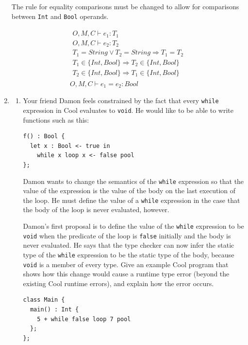 \documentclass[11pt]{article}
\begin{document}
\begin{enumerate}
The rule for equality comparisons must be changed to allow for
comparisons between \texttt{Int} and \texttt{Bool} operands.

\begin{equation}
\begin{array}{c}
\begin{array}{l}
O, M, C \vdash e_{1} : T_{1} \\
O, M, C \vdash e_{2} : T_{2} \\
T_{1} = String \lor T_{2} = String \Rightarrow T_{1} = T_{2} \\
T_{1} \in \{Int, Bool\} \Rightarrow T_{2} \in \{Int, Bool\} \\
T_{2} \in \{Int, Bool\} \Rightarrow T_{1} \in \{Int, Bool\}
\end{array} \\
\hline
O, M, C \vdash e_{1} = e_{2} : Bool
\end{array}
\tag*{[Equal]}
\end{equation}

\item
\begin{enumerate}
\item Your friend Damon feels constrained by the fact that every
\texttt{while} expression in Cool evaluates to \texttt{void}.  He
would like to be able to write functions such as this:
\begin{verbatim}
f() : Bool {
  let x : Bool <- true in
    while x loop x <- false pool
};
\end{verbatim}
Damon wants to change the semantics of the \texttt{while} expression
so that the value of the expression is the value of the body on the
last execution of the loop.  He must define the value of a
\texttt{while} expression in the case that the body of the loop is
never evaluated, however.

Damon's first proposal is to define the value of the \texttt{while}
expression to be \texttt{void} when the predicate of the loop is
\texttt{false} initially and the body is never evaluated.  He says
that the type checker can now infer the static type of the
\texttt{while} expression to be the static type of the body, because
\texttt{void} is a member of every type.  Give an example Cool program
that shows how this change would cause a runtime type error (beyond
the existing Cool runtime errors), and explain how the error occurs.
\begin{verbatim}
class Main {
  main() : Int {
    5 + while false loop 7 pool
  };
};
\end{verbatim}


\end{enumerate}
\end{enumerate}
\end{document}

